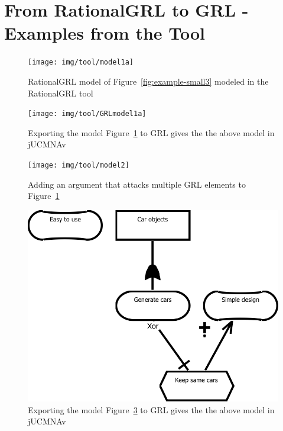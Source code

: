 \section{From RationalGRL to GRL - Examples from the Tool}
\label{sect:tool-screenshots}

\begin{figure}[ht]
\centering
\texttt{[image: img/tool/model1a]}
\caption{RationalGRL model of Figure~\ref{fig:example-small3} modeled in the RationalGRL tool}
\label{fig:tool:figfrompaper}
\end{figure}

\begin{figure}[ht]
\centering
\texttt{[image: img/tool/GRLmodel1a]}
\caption{Exporting the model Figure~\ref{fig:tool:figfrompaper} to GRL gives the the above model in jUCMNAv}
\label{fig:tool:figfrompaper1}
\end{figure}

\begin{figure}[ht]
\centering
\texttt{[image: img/tool/model2]}
\caption{Adding an argument that attacks multiple GRL elements to Figure~\ref{fig:tool:figfrompaper}}
\label{fig:tool:multipleattack}
\end{figure}

\begin{figure}[ht]
\centering
\includegraphics[scale=0.3]{img/tool/GRLmodel1b}
\caption{Exporting the model Figure~\ref{fig:tool:multipleattack} to GRL gives the the above model in jUCMNAv}
\label{fig:tool:multipleattack1}
\end{figure}